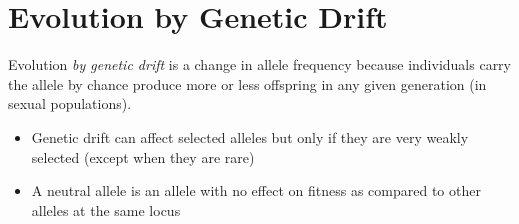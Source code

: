 \documentclass{article}
\begin{document}
    \section{Evolution by Genetic Drift}
        Evolution \emph{by genetic drift} is a change in allele frequency because individuals carry the allele by chance produce more or less offspring in any given generation (in sexual populations).
        \begin{itemize}
            \item Genetic drift can affect selected alleles but only if they are very weakly selected (except when they are rare)
            \item A neutral allele is an allele with no effect on fitness as compared to other alleles at the same locus
        \end{itemize}
\end{document}
